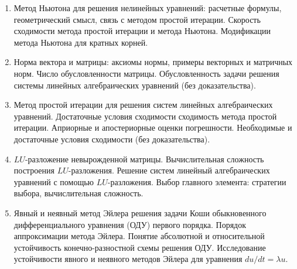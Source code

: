 % 
%

\begin{enumerate}
\item Метод Ньютона для решения нелинейных уравнений: расчетные формулы, геометрический смысл, связь  с методом простой итерации. Скорость сходимости метода простой итерации  и метода Ньютона. Модификации метода Ньютона для кратных корней.

\item Норма вектора и матрицы: аксиомы нормы, примеры векторных и матричных норм. Число обусловленности матрицы. Обусловленность задачи решения системы линейных алгебраических уравнений (без доказательства).

\item Метод простой итерации для решения систем линейных алгебраических уравнений. Достаточные условия сходимости сходимость метода простой итерации. Априорные и апостериорные оценки погрешности. Необходимые и достаточные условия сходимости (без доказательства).

\item $LU$-разложение невырожденной матрицы. Вычислительная сложность построения $LU$-разложения. Решение систем линейный алгебраических уравнений с помощью $LU$-разложения. Выбор главного элемента: стратегии выбора, вычислительная сложность.  


\item Явный и неявный метод Эйлера решения задачи Коши обыкновенного дифференциального уравнения (ОДУ) первого порядка. Порядок аппроксимации метода Эйлера. Понятие абсолютной и относительной устойчивость конечно-разностной схемы решения ОДУ. Исследование устойчивости явного и неявного методов Эйлера для уравнения $du/dt = \lambda u$.

\end{enumerate}
